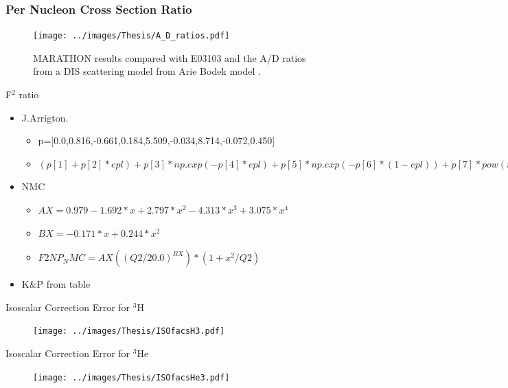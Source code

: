 \documentclass[12pt,usenames,dvipsnames]{beamer}
\begin{document}
\begin{frame}{}
\frametitle{Per Nucleon Cross Section Ratio}
\vspace{-8pt}
\begin{figure}
\texttt{[image: ../images/Thesis/A\_D\_ratios.pdf]}
\caption*{MARATHON results compared with E03103 \cite{E3103} and the A/D ratios from a DIS scattering model from Arie Bodek model \cite{bodek}.}
\end{figure}

\end{frame}


\begin{frame}

F$^2$ ratio

\begin{itemize}
\item J.Arrigton.
\begin{itemize}
\item  p=[0.0,0.816,-0.661,0.184,5.509,-0.034,8.714,-0.072,0.450]
\item $(p[1] +  p[2]*epl) + p[3]*np.exp(-p[4]*epl) +  p[5]*np.exp(-p[6]*(1-epl)) + 
p[7]* pow(max(0,epl-p[8]),2)$
\end{itemize}
\item NMC
\begin{itemize}
\item    $AX=0.979-1.692* x+2.797* x^2-4.313* x^3+3.075* x^4$
\item $BX=-0.171* x+0.244* x^2$
\item $F2NP_NMC=AX((Q2/20.0)^{BX})*(1+x^{2}/Q2)$
\end{itemize}
\item K\&P from table
\end{itemize}
\end{frame}



\begin{frame}{Isoscalar Correction Error for $^3$H  }
	\vspace{-.25cm}
	\begin{figure}
		\texttt{[image: ../images/Thesis/ISOfacsH3.pdf]}
	\end{figure}
\end{frame}

\begin{frame}{Isoscalar Correction Error for $^3$He }
	\vspace{-.25cm}
	\begin{figure}
		\texttt{[image: ../images/Thesis/ISOfacsHe3.pdf]}
	\end{figure}
\end{frame}
\end{document}
